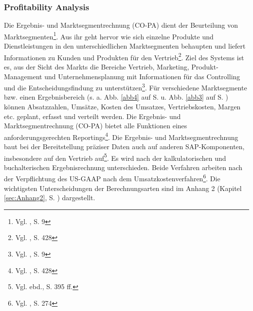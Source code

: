 \subsubsection{Profitability Analysis} %
Die Ergebnis- und Marktsegmentrechnung (CO-PA) dient der Beurteilung von Marktsegmenten\footnote{Vgl. \cite{SAPCOPA2001}, S. 9}.
Aus ihr geht hervor wie sich einzelne Produkte und Dienstleistungen in den unterschiedlichen Marktsegmenten behaupten und liefert Informationen zu Kunden und Produkten für den Vertrieb\footnote{Vgl. \cite{Patel2009}, S. 428}.
Ziel des Systems ist es, aus der Sicht des Markts die Bereiche Vertrieb, Marketing, Produkt-Management und Unternehmensplanung mit Informationen für das Controlling und die Entscheidungsfindung zu unterstützen\footnote{Vgl. \cite{SAPCOPA2001}, S. 9}.
Für verschiedene Marktsegmente bzw. einen Ergebnisbereich (s. a. Abb. \ref{abb4} auf S. \pageref{abb4} u. Abb. \ref{abb3} auf S. \pageref{abb3}) können Absatzzahlen, Umsätze, Kosten des Umsatzes, Vertriebskosten, Margen etc. geplant, erfasst und verteilt werden. Die Ergebnis- und Marktsegmentrechnung (CO-PA) bietet alle Funktionen eines anforderungsgerechten Reportings\footnote{Vgl. \cite{Patel2009}, S. 428}.
Die Ergebnis- und Marktsegmentrechnung baut bei der Bereitstellung präziser Daten auch auf anderen SAP-Komponenten, insbesondere auf den Vertrieb auf\footnote{Vgl. ebd., S. 395 ff.}. Es wird nach der kalkulatorischen und buchalterischen Ergebnisrechnung unterschieden. Beide Verfahren arbeiten nach der Verpflichtung des US-GAAP nach dem Umsatzkostenverfahren\footnote{Vgl. \cite{Klein2010}, S. 274}. Die wichtigsten Unterscheidungen der Berechnungsarten sind im Anhang 2 (Kapitel \ref{sec:Anhang2}, S. \pageref{sec:Anhang2}) dargestellt.
